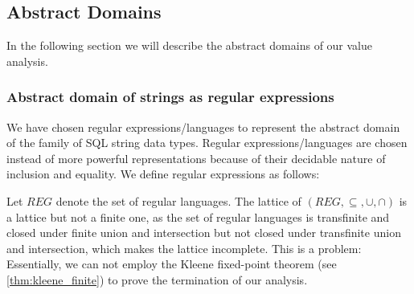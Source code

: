 \subsection{Abstract Domains}\label{subsec:abstract-domains}

In the following section we will describe the abstract domains of our value analysis.

\subsubsection{Abstract domain of strings as regular expressions}\label{subsubsec:abstract_domains_strings}
We have chosen regular expressions/languages to represent the abstract domain of the family of SQL string data types.
Regular expressions/languages are chosen instead of more powerful representations because of their decidable nature of inclusion and equality.
We define regular expressions as follows:

Let $REG$ denote the set of regular languages.
The lattice of $(REG, \subseteq, \cup, \cap)$ is a lattice but not a finite one, as the set of regular languages is transfinite and closed under finite union and intersection but not closed under transfinite union and intersection, which makes the lattice incomplete.
This is a problem: Essentially, we can not employ the Kleene fixed-point theorem (see \autoref{thm:kleene_finite}) to prove the termination of our analysis.

